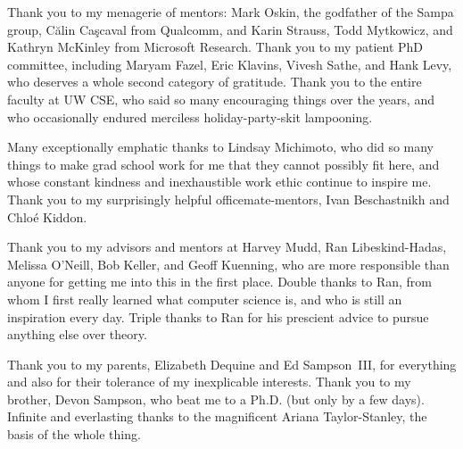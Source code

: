 Thank you to my menagerie of mentors:
Mark Oskin, the godfather of the Sampa group,
Călin Caşcaval from Qualcomm,
and
Karin Strauss, Todd Mytkowicz, and Kathryn McKinley from Microsoft Research.
Thank you to my patient PhD committee, including
Maryam Fazel, Eric Klavins, Vivesh Sathe, and Hank Levy, who deserves a whole
second category of gratitude.
Thank you to the entire faculty at UW CSE, who said so many encouraging things
over the years, and who occasionally endured merciless holiday-party-skit
lampooning.

Many exceptionally emphatic thanks to Lindsay Michimoto, who did so many
things to make grad school work for me that they cannot possibly fit here, and
whose constant kindness and inexhaustible work ethic continue to inspire me.
Thank you to my surprisingly helpful officemate-mentors, Ivan Beschastnikh and
Chloé Kiddon.

Thank you to my advisors and mentors at Harvey Mudd,
Ran Libeskind-Hadas,
Melissa O'Neill,
Bob Keller,
and Geoff Kuenning,
who are more responsible than anyone for getting me into this in the first
place.
Double thanks to Ran, from whom I first really learned what computer science
is, and who is still an inspiration every day.
Triple thanks to Ran for his prescient advice to pursue anything else over
theory.

Thank you to my parents, Elizabeth Dequine and Ed Sampson~III, for everything
and also for their tolerance of my inexplicable interests.
Thank you to my brother, Devon Sampson, who beat me to a Ph.D. (but only by a
few days).
Infinite and everlasting thanks to the magnificent Ariana Taylor-Stanley, the
basis of the whole thing.
